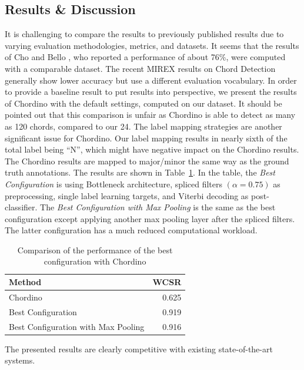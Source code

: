 \documentclass{article}
\begin{document}
\subsection{Results \& Discussion}
It is challenging to compare the results to previously published results due to varying evaluation methodologies, metrics, and datasets. It seems that the results of Cho and Bello \cite{cho2013mirex}, who reported a performance of about 76\%, were computed with a comparable dataset. The recent MIREX results on Chord Detection generally show lower accuracy but use a different evaluation vocabulary. In order to provide a baseline result to put results into perspective, we present the results of Chordino \cite{mauch2010approximate} with the default settings, computed on our dataset. It should be pointed out that this comparison is unfair as Chordino is able to detect as many as 120 chords, compared to our 24. The label mapping strategies are another significant issue for Chordino. Our label mapping results in nearly sixth of the total label being ``N'', which might have negative impact on the Chordino results. The Chordino results are mapped to major/minor the same way as the ground truth annotations. The results are shown in Table~\ref{tab: final}. In the table, the \textit{Best Configuration} is using Bottleneck architecture, spliced filters $(\alpha = 0.75)$ as preprocessing, single label learning targets, and Viterbi decoding as post-classifier. The \textit{Best Configuration with Max Pooling} is the same as the best configuration except applying another max pooling layer after the spliced filters. The latter configuration has a much reduced computational workload. 
\begin{table}
\centering
\begin{tabular*}{\columnwidth}{@{\extracolsep{\fill}}lr}
\toprule
\textbf{Method}   &  \textbf{WCSR}   \\ \midrule
Chordino & 0.625       \\
Best Configuration &  0.919   \\ 
Best Configuration with Max Pooling & 0.916 \\ \bottomrule
\end{tabular*}
\caption{Comparison of the performance of the best configuration with Chordino}
\label{tab: final}
\end{table}
The presented results are clearly competitive with existing state-of-the-art systems.
\end{document}
